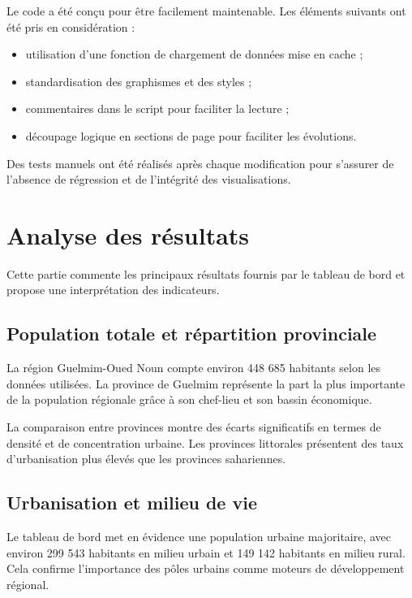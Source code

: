\documentclass[12pt,a4paper,oneside]{report}
\begin{document}
Le code a été conçu pour être facilement maintenable. Les éléments suivants ont été pris en considération :

\begin{itemize}[leftmargin=*]
  \item utilisation d'une fonction de chargement de données mise en cache ;
  \item standardisation des graphismes et des styles ;
  \item commentaires dans le script pour faciliter la lecture ;
  \item découpage logique en sections de page pour faciliter les évolutions.
\end{itemize}

Des tests manuels ont été réalisés après chaque modification pour s'assurer de l'absence de régression et de l'intégrité des visualisations.

\chapter{Analyse des résultats}

Cette partie commente les principaux résultats fournis par le tableau de bord et propose une interprétation des indicateurs.

\section{Population totale et répartition provinciale}

La région Guelmim-Oued Noun compte environ 448 685 habitants selon les données utilisées. La province de Guelmim représente la part la plus importante de la population régionale grâce à son chef-lieu et son bassin économique.

La comparaison entre provinces montre des écarts significatifs en termes de densité et de concentration urbaine. Les provinces littorales présentent des taux d'urbanisation plus élevés que les provinces sahariennes.

\section{Urbanisation et milieu de vie}

Le tableau de bord met en évidence une population urbaine majoritaire, avec environ 299 543 habitants en milieu urbain et 149 142 habitants en milieu rural. Cela confirme l'importance des pôles urbains comme moteurs de développement régional.
\end{document}
